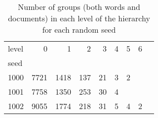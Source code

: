 \begin{table}[tb]
\centering
\caption[Number of groups per level and seed]{Number of groups (both words and documents) in each level of the hierarchy for each random seed}
\label{tab:levels}
\begin{tabular}{l|rrrrrrrr}
\toprule
level &     0 &     1 &    2 &   3 &  4 &     5 &     6 \\
seed &       &       &      &     &    &       &       \\
\midrule
1000 &  7721 &  1418 &  137 &  21 &  3 &     2 &   \\
1001 &  7758 &  1350 &  253 &  30 &  4 &   &   \\
1002 &  9055 &  1774 &  218 &  31 &  5 &     4 &     2 \\
\bottomrule
\end{tabular}
\end{table}
